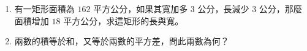 \begin{enumerate}
\begin{multicols}{2}
\begin{enumerate}[(i)]
    \item $\begin{cases}
    x^2+xy=36 \\
    y^2+xy=45
    \end{cases}$

    \item $\begin{cases}
    (x+1)(2y+1) = 5x+9y=1 \\
    (x+2)(3y+1) = 9x+13y+2
    \end{cases}$\label{note:b2-ch1-ex1-5-q1-11}
  \end{enumerate}
  \end{multicols}

  \item 有一矩形面積為 $162$ 平方公分，如果其寬加多 $3$ 公分，長減少 $3$ 公分，那麼面積增加 $18$ 平方公分，求這矩形的長與寬。

  \item 兩數的積等於和，又等於兩數的平方差，問此兩數為何？
\end{enumerate}
